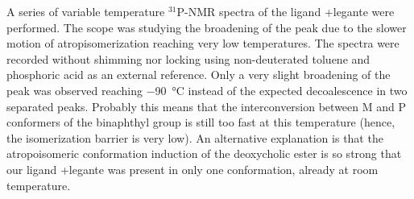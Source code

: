     


% 
% 
% 





    A series of variable temperature $^{31}$P-NMR spectra of the ligand \cmpd+{legante} were performed. The scope was studying the broadening of the peak  due to the slower motion of atrop\-isomerization reaching very low temperatures. The spectra were recorded without shimming nor locking using non-deuterated toluene and phosphoric acid as an external reference. Only a very slight broadening of the peak was observed reaching \SI{-90}{\celsius} instead of the expected decoalescence in two separated peaks. 
    Probably this means that the interconversion between M and P conformers of the bi\-naphthyl group is still too fast at this temperature (hence,  the isomerization barrier is very low). An alternative explanation is that the atro\-poisomeric conformation induction of the de\-oxy\-cholic ester is so strong that our ligand \cmpd+{legante} was present in only one conformation, already at room temperature.


